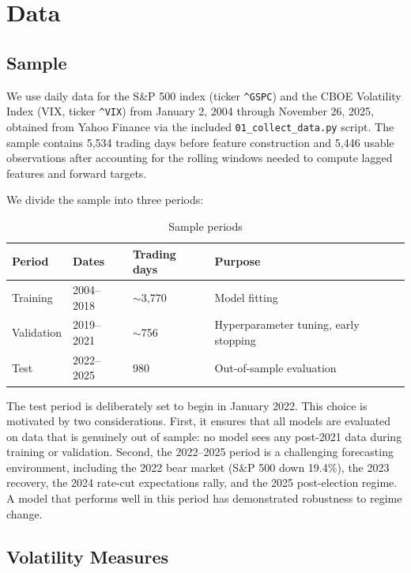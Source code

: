 \section{Data}\label{sec:data}

\subsection{Sample}

We use daily data for the S\&P 500 index (ticker \texttt{\^{}GSPC}) and the CBOE Volatility Index (VIX, ticker \texttt{\^{}VIX}) from January 2, 2004 through November 26, 2025, obtained from Yahoo Finance via the included \texttt{01\_collect\_data.py} script. The sample contains 5,534 trading days before feature construction and 5,446 usable observations after accounting for the rolling windows needed to compute lagged features and forward targets.

We divide the sample into three periods:

\begin{table}[H]
\centering
\caption{Sample periods}
\label{tab:sample}
\begin{tabular}{l l l l}
\toprule
\textbf{Period} & \textbf{Dates} & \textbf{Trading days} & \textbf{Purpose} \\
\midrule
Training & 2004--2018 & $\sim$3,770 & Model fitting \\
Validation & 2019--2021 & $\sim$756 & Hyperparameter tuning, early stopping \\
Test & 2022--2025 & 980 & Out-of-sample evaluation \\
\bottomrule
\end{tabular}
\end{table}

The test period is deliberately set to begin in January 2022. This choice is motivated by two considerations. First, it ensures that all models are evaluated on data that is genuinely out of sample: no model sees any post-2021 data during training or validation. Second, the 2022--2025 period is a challenging forecasting environment, including the 2022 bear market (S\&P 500 down 19.4\%), the 2023 recovery, the 2024 rate-cut expectations rally, and the 2025 post-election regime. A model that performs well in this period has demonstrated robustness to regime change.

\subsection{Volatility Measures}

